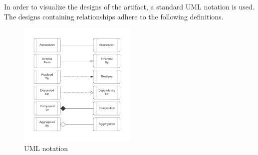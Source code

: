 In order to visualize the designs of the artifact, a standard UML notation is used. The
designs containing relationships adhere to the following definitions.

\begin{figure}[H]
  \centering
  \includegraphics[width=0.5\textwidth]{figures/class_diagram_legenda.pdf}
  \caption[UML Notation used]{UML notation}
  \label{fi:class_diagram_relationship_notation}
\end{figure}